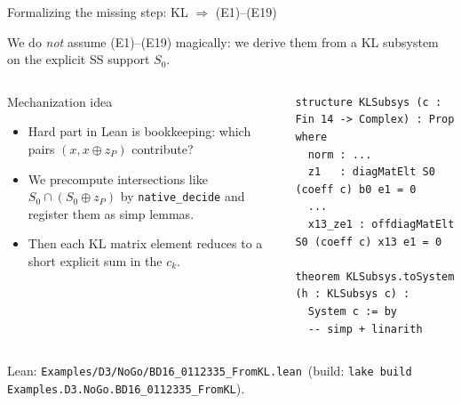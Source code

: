 \documentclass[aspectratio=169,t]{beamer}
\newcommand{\code}[1]{\texttt{\small #1}}
\begin{document}
\begin{frame}[fragile]{Formalizing the missing step: KL $\Rightarrow$ (E1)--(E19)}

We do \emph{not} assume (E1)--(E19) magically: we derive them from a KL subsystem
on the explicit SS support $S_0$.

\begin{columns}[T]
\begin{block}{Mechanization idea}
\begin{itemize}\setlength\itemsep{1pt}
\item Hard part in Lean is bookkeeping: which pairs $(x,x\oplus z_P)$ contribute?
\item We precompute intersections like $S_0\cap(S_0\oplus z_P)$ by \code{native\_decide}
and register them as simp lemmas.
\item Then each KL matrix element reduces to a short explicit sum in the $c_k$.
\end{itemize}
\end{block}

\begin{lstlisting}[style=lean,basicstyle=\ttfamily\scriptsize]
structure KLSubsys (c : Fin 14 -> Complex) : Prop where
  norm : ...
  z1   : diagMatElt S0 (coeff c) b0 e1 = 0
  ...
  x13_ze1 : offdiagMatElt S0 (coeff c) x13 e1 = 0

theorem KLSubsys.toSystem (h : KLSubsys c) :
  System c := by
  -- simp + linarith
\end{lstlisting}
\end{columns}

\textcolor{Slate}{\scriptsize Lean: \code{Examples/D3/NoGo/BD16\_0112335\_FromKL.lean} \,(build: \code{lake build Examples.D3.NoGo.BD16\_0112335\_FromKL}).}
\end{frame}
\end{document}
